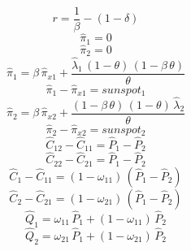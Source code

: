 \begin{dmath*}
\end{dmath*}
\begin{dmath*}
r = \frac{1}{{{\beta}}}-\left(1-{{\delta}}\right)
\end{dmath*}
\begin{dmath}
{{\hat{\pi}_{1}}}=0
\end{dmath}
\begin{dmath}
{{\hat{\pi}_{2}}}=0
\end{dmath}
\begin{dmath}
{{\hat{\pi}_{1}}}={{\beta}}\, {{\hat{\pi}_{x1}}}+\frac{{{\hat{\lambda}_{1}}}\, \left(1-{{\theta}}\right)\, \left(1-{{\beta}}\, {{\theta}}\right)}{{{\theta}}}
\end{dmath}
\begin{dmath}
{{\hat{\pi}_{1}}}-{{\hat{\pi}_{x1}}}={{sunspot_{1}}}
\end{dmath}
\begin{dmath}
{{\hat{\pi}_{2}}}={{\beta}}\, {{\hat{\pi}_{x2}}}+\frac{\left(1-{{\beta}}\, {{\theta}}\right)\, \left(1-{{\theta}}\right)\, {{\hat{\lambda}_{2}}}}{{{\theta}}}
\end{dmath}
\begin{dmath}
{{\hat{\pi}_{2}}}-{{\hat{\pi}_{x2}}}={{sunspot_{2}}}
\end{dmath}
\begin{dmath}
{{\hat{C}_{12}}}-{{\hat{C}_{11}}}={{\hat{P}_{1}}}-{{\hat{P}_{2}}}
\end{dmath}
\begin{dmath}
{{\hat{C}_{22}}}-{{\hat{C}_{21}}}={{\hat{P}_{1}}}-{{\hat{P}_{2}}}
\end{dmath}
\begin{dmath}
{{\hat{C}_{1}}}-{{\hat{C}_{11}}}=\left(1-{{\omega_{11}}}\right)\, \left({{\hat{P}_{1}}}-{{\hat{P}_{2}}}\right)
\end{dmath}
\begin{dmath}
{{\hat{C}_{2}}}-{{\hat{C}_{21}}}=\left(1-{{\omega_{21}}}\right)\, \left({{\hat{P}_{1}}}-{{\hat{P}_{2}}}\right)
\end{dmath}
\begin{dmath}
{{\hat{Q}_{1}}}={{\omega_{11}}}\, {{\hat{P}_{1}}}+\left(1-{{\omega_{11}}}\right)\, {{\hat{P}_{2}}}
\end{dmath}
\begin{dmath}
{{\hat{Q}_{2}}}={{\omega_{21}}}\, {{\hat{P}_{1}}}+\left(1-{{\omega_{21}}}\right)\, {{\hat{P}_{2}}}
\end{dmath}
